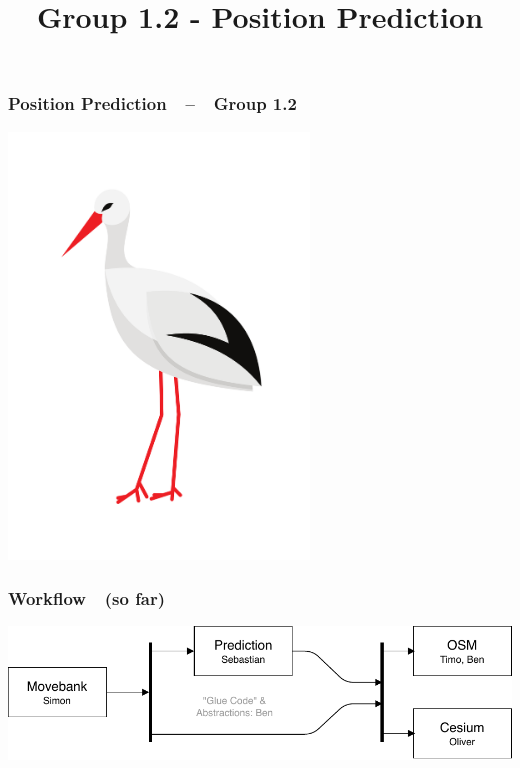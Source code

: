 \documentclass[xcolor=dvipsnames]{beamer}
\title[] {Group 1.2 - Position Prediction}
\date{} %
\begin{document}
\begin{frame}
	\frametitle{\textbf{Position Prediction}~~--~~Group 1.2}
	\centering
	\includegraphics[width=0.6\textwidth]{stork.png}
\end{frame}

\begin{frame}
	\frametitle{\textbf{Workflow}~~(so far)}
	\includegraphics[width=\textwidth]{diagrams/Tasks.pdf}
\end{frame}
\end{document}

